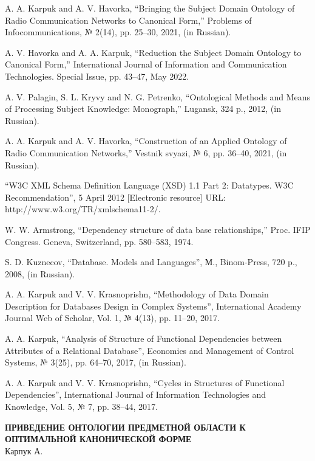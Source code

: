 \documentclass{scndocument}
\begin{document}
\begin{thebibliography}{99}

A. A. Karpuk and A. V. Havorka, “Bringing the Subject Domain Ontology of Radio Communication Networks to Canonical Form,” Problems of Infocommunications, № 2(14), pp. 25–30, 2021, (in Russian).

A. V. Havorka and A. A. Karpuk, “Reduction the Subject Domain Ontology to Canonical Form,” International Journal of Information and Communication Technologies. Special Issue, pp. 43–47, May 2022.

A. V. Palagin, S. L. Kryvy and N. G. Petrenko, “Ontological Methods and Means of Processing Subject Knowledge: Monograph,” Lugansk, 324 p., 2012, (in Russian).

A. A. Karpuk and A. V. Havorka, “Construction of an Applied Ontology of Radio Communication Networks,” Vestnik svyazi, № 6, pp. 36–40, 2021, (in Russian).

“W3C XML Schema Definition Language (XSD) 1.1 Part 2: Datatypes. W3C Recommendation”, 5 April 2012 [Electronic resource] URL: http://www.w3.org/TR/xmlschema11-2/.

W. W. Armstrong, “Dependency structure of data base relationships,” Proc. IFIP Congress. Geneva, Switzerland, pp. 580–583, 1974.

S. D. Kuznecov, “Database. Models and Languages”, М., Binom-Press, 720 p., 2008, (in Russian).

A. A. Karpuk and V. V. Krasnoprishn, “Methodology of Data Domain Description for Databases Design in Complex Systems”, International Academy Journal Web of Scholar, Vol. 1, № 4(13), pp. 11–20, 2017.

A. A. Karpuk, “Analysis of Structure of Functional Dependencies between Attributes of a Relational Database”, Economics and Management of Control Systems, № 3(25), pp. 64–70, 2017, (in Russian).

A. A. Karpuk and V. V. Krasnoprishn, “Cycles in Structures of Functional Dependencies”, International Journal of Information Technologies and Knowledge, Vol. 5, № 7, pp. 38–44, 2017.

\end{thebibliography}

\begin{center}
\textbf{ПРИВЕДЕНИЕ ОНТОЛОГИИ ПРЕДМЕТНОЙ ОБЛАСТИ К ОПТИМАЛЬНОЙ КАНОНИЧЕСКОЙ ФОРМЕ} \\
Карпук А.
\end{center}
\end{document}
